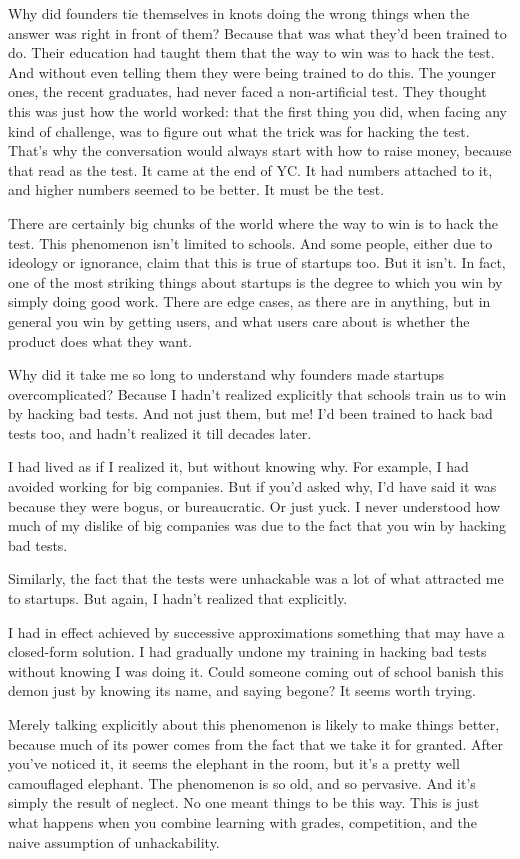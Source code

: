 \documentclass[12pt]{book}
\begin{document}
Why did founders tie themselves in knots doing the wrong things when the
answer was right in front of them? Because that was what they'd been
trained to do. Their education had taught them that the way to win was
to hack the test. And without even telling them they were being trained
to do this. The younger ones, the recent graduates, had never faced a
non-artificial test. They thought this was just how the world worked:
that the first thing you did, when facing any kind of challenge, was to
figure out what the trick was for hacking the test. That's why the
conversation would always start with how to raise money, because that
read as the test. It came at the end of YC. It had numbers attached to
it, and higher numbers seemed to be better. It must be the test.

There are certainly big chunks of the world where the way to win is to
hack the test. This phenomenon isn't limited to schools. And some
people, either due to ideology or ignorance, claim that this is true of
startups too. But it isn't. In fact, one of the most striking things
about startups is the degree to which you win by simply doing good work.
There are edge cases, as there are in anything, but in general you win
by getting users, and what users care about is whether the product does
what they want.

Why did it take me so long to understand why founders made startups
overcomplicated? Because I hadn't realized explicitly that schools train
us to win by hacking bad tests. And not just them, but me! I'd been
trained to hack bad tests too, and hadn't realized it till decades
later.

I had lived as if I realized it, but without knowing why. For example, I
had avoided working for big companies. But if you'd asked why, I'd have
said it was because they were bogus, or bureaucratic. Or just yuck. I
never understood how much of my dislike of big companies was due to the
fact that you win by hacking bad tests.

Similarly, the fact that the tests were unhackable was a lot of what
attracted me to startups. But again, I hadn't realized that explicitly.

I had in effect achieved by successive approximations something that may
have a closed-form solution. I had gradually undone my training in
hacking bad tests without knowing I was doing it. Could someone coming
out of school banish this demon just by knowing its name, and saying
begone? It seems worth trying.

Merely talking explicitly about this phenomenon is likely to make things
better, because much of its power comes from the fact that we take it
for granted. After you've noticed it, it seems the elephant in the room,
but it's a pretty well camouflaged elephant. The phenomenon is so old,
and so pervasive. And it's simply the result of neglect. No one meant
things to be this way. This is just what happens when you combine
learning with grades, competition, and the naive assumption of
unhackability.
\end{document}
